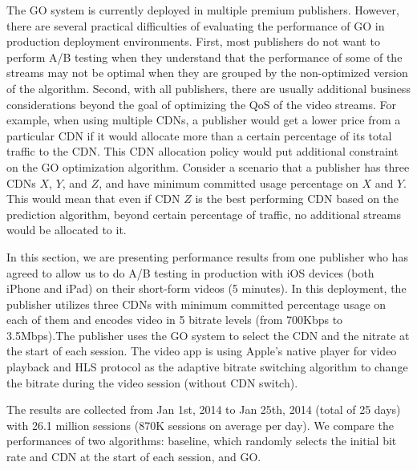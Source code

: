 The GO system is currently deployed in multiple premium publishers. However, there are several practical difficulties of evaluating the performance of GO in production deployment environments.  First, most publishers do not want to perform A/B testing when they understand that the performance of some of the streams may not be optimal when they are grouped by the non-optimized version of the algorithm. Second, with all publishers, there are usually additional business considerations beyond the goal of optimizing the QoS of the video streams. For example, when using multiple CDNs, a publisher would get a lower price from a particular CDN if it would allocate more than a certain percentage of its total traffic to the CDN.  This CDN allocation policy would put additional constraint on the GO optimization algorithm.  Consider a scenario that a publisher has three CDNs $X$, $Y$, and $Z$, and have minimum committed usage percentage on $X$ and $Y$. This would mean that even if CDN $Z$ is the best performing CDN based on the prediction algorithm, beyond certain percentage of traffic, no additional streams would be allocated to it. 

In this section, we are presenting performance results from one publisher who has agreed to allow us to do A/B testing in production with iOS devices (both iPhone and iPad) on their short-form videos (5 minutes).  In this deployment, the publisher utilizes three CDNs with minimum committed percentage usage on each of them and encodes video in 5 bitrate levels (from 700Kbps to 3.5Mbps).The publisher uses the GO system to select the CDN and the nitrate at the start of each session.  The video app is using Apple’s native player for video playback and  HLS protocol as the adaptive 
bitrate switching algorithm to change the bitrate during the video session (without CDN switch). 
 
The results are collected from Jan 1st, 2014 to Jan 25th, 2014 (total of 25 days) with 26.1 million sessions (870K sessions on average per day).
We compare the performances of two algorithms:  baseline, which randomly selects the initial bit rate and CDN at the start of each session,  and GO.




